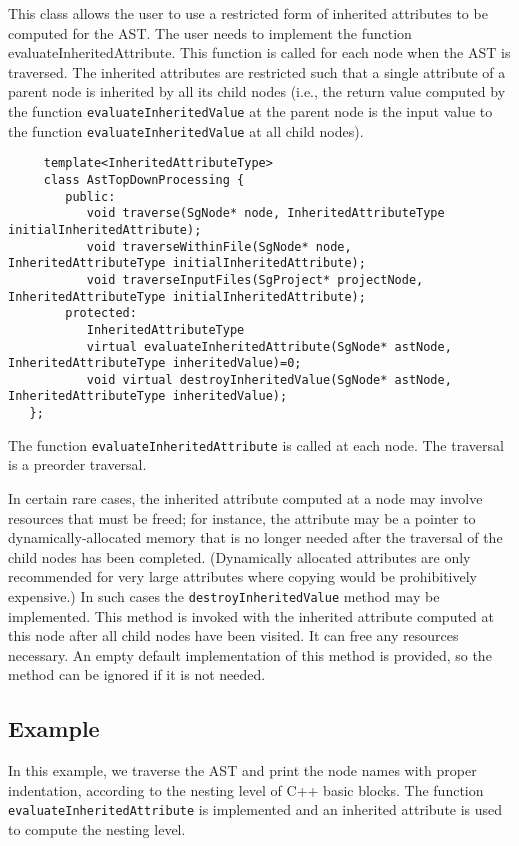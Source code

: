 This class allows the user to use a restricted form of inherited attributes to
be computed for the AST. The user needs to implement the function
evaluateInheritedAttribute. This function is called for each node when
the AST is traversed. The inherited attributes are restricted such
that a single attribute of a parent node is inherited by all its child
nodes (i.e., the return value computed by the function {\tt evaluateInheritedValue} 
at the parent node is the input value to the function {\tt evaluateInheritedValue} 
at all child nodes).

{\indent
{\mySmallFontSize
\begin{verbatim}
     template<InheritedAttributeType>
     class AstTopDownProcessing {
        public:
           void traverse(SgNode* node, InheritedAttributeType initialInheritedAttribute);
           void traverseWithinFile(SgNode* node, InheritedAttributeType initialInheritedAttribute);
           void traverseInputFiles(SgProject* projectNode, InheritedAttributeType initialInheritedAttribute);
        protected:
           InheritedAttributeType 
           virtual evaluateInheritedAttribute(SgNode* astNode, InheritedAttributeType inheritedValue)=0;
           void virtual destroyInheritedValue(SgNode* astNode, InheritedAttributeType inheritedValue);
   };
\end{verbatim}
}}

The function {\tt evaluateInheritedAttribute} is called at each node. The traversal is a preorder traversal.

In certain rare cases, the inherited attribute computed at a node may involve
resources that must be freed; for instance, the attribute may be a pointer to
dynamically-allocated memory that is no longer needed after the traversal of
the child nodes has been completed. (Dynamically allocated attributes are only
recommended for very large attributes where copying would be prohibitively
expensive.) In such cases the {\tt destroyInheritedValue} method may be
implemented. This method is invoked with the inherited attribute computed at
this node after all child nodes have been visited. It can free any resources
necessary. An empty default implementation of this method is provided, so the
method can be ignored if it is not needed.

\subsection{Example}
   In this example, we traverse the AST and print the node names with proper indentation,
according to the nesting level of C++ basic blocks. The function 
{\tt evaluateInheritedAttribute} is implemented and an inherited attribute is used to
compute the nesting level.

